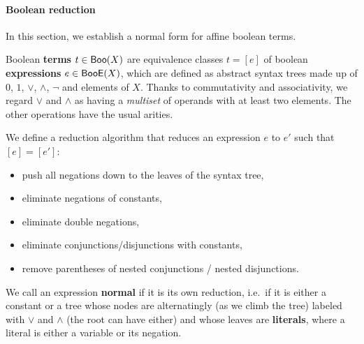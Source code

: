 \documentclass[a4paper]{memoir}
\begin{document}
\paragraph{Boolean reduction}
In this section, we establish a normal form for affine boolean terms.
\begin{definition} \label{def:bool:reduction}
	Boolean \textbf{terms} $t \in \mathsf{Boo}(X)$ are equivalence classes $t = [e]$ of boolean \textbf{expressions} $e \in \mathsf{BooE}(X)$, which are defined as abstract syntax trees made up of $0$, $1$, $\vee$, $\wedge$, $\lnot$ and elements of $X$. Thanks to commutativity and associativity, we regard $\vee$ and $\wedge$ as having a \emph{multiset} of operands with at least two elements. The other operations have the usual arities.
	
	We define a reduction algorithm that reduces an expression $e$ to $e'$ such that $[e] = [e']$:
	\begin{itemize}
		\item push all negations down to the leaves of the syntax tree,
    		\item eliminate negations of constants,
    		\item eliminate double negations,
    		\item eliminate conjunctions/disjunctions with constants,
    		\item remove parentheses of nested conjunctions / nested disjunctions.
	\end{itemize}
	We call an expression \textbf{normal} if it is its own reduction, i.e.\ if it is either a constant or a tree whose nodes are alternatingly (as we climb the tree) labeled with $\vee$ and $\wedge$ (the root can have either) and whose leaves are \textbf{literals}, where a literal is either a variable or its negation.
\end{definition}
\end{document}
